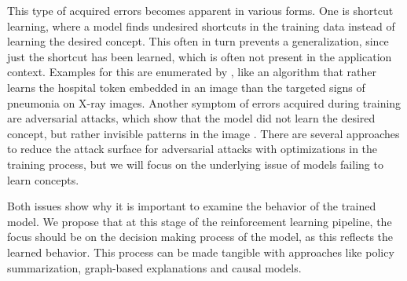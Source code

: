 \documentclass[twoside,11pt]{article}
\begin{document}
This type of acquired errors becomes apparent in various forms. One is shortcut learning, where a model finds undesired shortcuts in the training data instead of learning the desired concept. This often in turn prevents a generalization, since just the shortcut has been learned, which is often not present in the application context. Examples for this are enumerated by \citet{GeirhosEtAl:2020:ShortcutLearningDNN}, like an algorithm that rather learns the hospital token embedded in an image than the targeted signs of pneumonia on X-ray images.
Another symptom of errors acquired during training are adversarial attacks, which show that the model did not learn the desired concept, but rather invisible patterns in the image \citep{GoodfellowShlensSzegedy:2014:AdversarialExamples}. There are several approaches to reduce the attack surface for adversarial attacks with optimizations in the training process, but we will focus on the underlying issue of models failing to learn concepts.

Both issues show why it is important to examine the behavior of the trained model. We propose that at this stage of the reinforcement learning pipeline, the focus should be on the decision making process of the model, as this reflects the learned behavior. This process can be made tangible with approaches like policy summarization, graph-based explanations and causal models.

\end{document}
